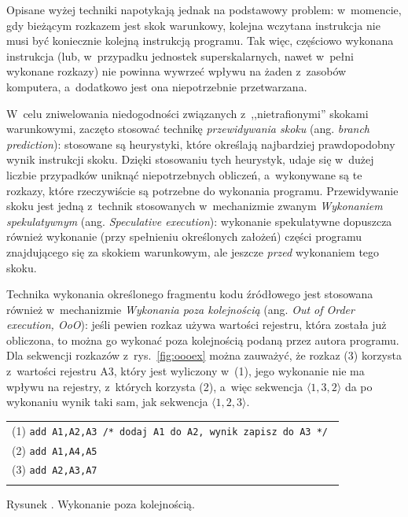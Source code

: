 \documentclass[12pt]{mwart}
\newcounter{figmain}
\newcommand{\myfigcounter}[1]{ \begin{center}Rysunek \arabic{figmain}. #1.\end{center} \addtocounter{figmain}{1} }
\begin{document}
%
\indent
	Opisane wyżej techniki napotykają jednak na podstawowy problem: w~momencie, gdy bieżącym rozkazem jest skok warunkowy, kolejna wczytana 
	instrukcja nie musi być koniecznie kolejną instrukcją programu. Tak więc, częściowo wykonana instrukcja (lub, w~przypadku jednostek
	superskalarnych, nawet w~pełni wykonane rozkazy) nie powinna wywrzeć wpływu na żaden z~zasobów komputera, 
	a~dodatkowo jest ona niepotrzebnie przetwarzana.
\par
%
\indent
	W~celu zniwelowania niedogodności związanych z~,,nietrafionymi'' skokami warunkowymi, zaczęto stosować technikę 
	\emph{przewidywania skoku} (ang. \emph{branch prediction}): stosowane są heurystyki, które określają najbardziej prawdopodobny
	wynik instrukcji skoku. Dzięki stosowaniu tych heurystyk, udaje się w~dużej liczbie przypadków uniknąć niepotrzebnych obliczeń,
	a~wykonywane są te rozkazy, które rzeczywiście są potrzebne do wykonania programu.
	Przewidywanie skoku jest jedną z~technik stosowanych w~mechanizmie zwanym \emph{Wykonaniem spekulatywnym} (ang. \emph{Speculative execution}):
	wykonanie spekulatywne dopuszcza również wykonanie (przy spełnieniu określonych założeń) części programu znajdującego się za skokiem warunkowym,
	ale jeszcze \emph{przed} wykonaniem tego skoku.
\par
%
\indent
	Technika wykonania określonego fragmentu kodu źródłowego jest stosowana również w~mechanizmie \emph{Wykonania poza kolejnością}
	(ang. \emph{Out of Order execution, OoO}): jeśli pewien rozkaz używa wartości rejestru, która została już obliczona, to można go wykonać
	poza kolejnością podaną przez autora programu. Dla sekwencji rozkazów z~rys.~\ref{fig:oooex}
	można zauważyć, że rozkaz (3) korzysta z~wartości rejestru A3, który jest wyliczony w~(1), jego wykonanie nie ma wpływu na rejestry, z~których 
	korzysta (2), a~więc sekwencja $\langle 1, 3, 2 \rangle $ da po wykonaniu wynik taki sam, jak sekwencja $\langle 1, 2, 3 \rangle $.
	\begin{center}
	\begin{tabular}{l}\\
		(1) {\tt add A1,A2,A3 /* dodaj A1 do A2, wynik zapisz do A3 */ } \\
		(2) {\tt add A1,A4,A5 } \\
		(3) {\tt add A2,A3,A7 } \\
		\\
	\end{tabular}
  \myfigcounter{Wykonanie poza kolejnością}
	\label{fig:oooex}
	\end{center}
\end{document}
